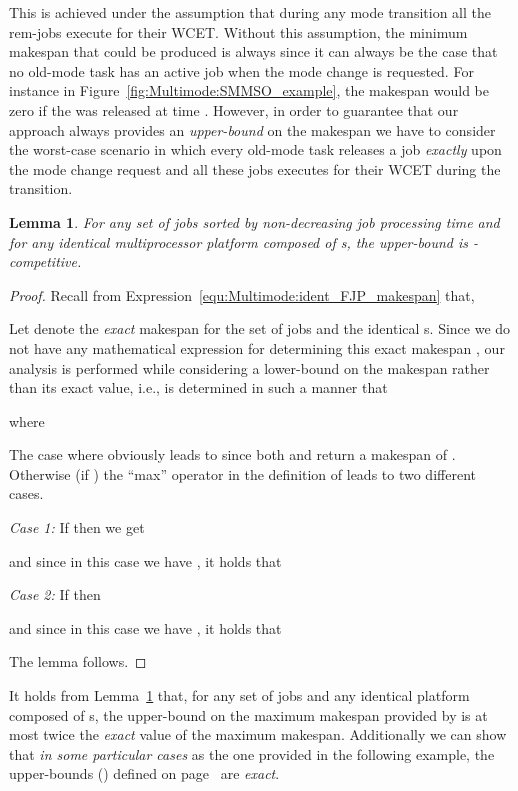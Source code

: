\documentclass{article}
\newtheorem{validity test}{Validity Test}
\newtheorem{Lemma}{Lemma}
\newtheorem{proof}{Proof}
\begin{document}
This is achieved under the assumption that during any mode transition all the rem-jobs execute for their WCET. Without this assumption, the minimum makespan that could be produced is always  since it can always be the case that no old-mode task has an active job when the mode change is requested. For instance in Figure~\ref{fig:Multimode:SMMSO_example}, the makespan would be zero if the  was released at time . However, in order to guarantee that our approach always provides an \emph{upper-bound} on the makespan we have to consider the worst-case scenario in which every old-mode task releases a job \emph{exactly} upon the mode change request and all these jobs executes for their WCET during the transition. 

\begin{Lemma}
\label{lem:Multimode:ident_accuracy_alpha}
For any set  of jobs sorted by non-decreasing job processing time and for any identical multiprocessor platform  composed of  s, the upper-bound  is -competitive.
\end{Lemma} 
\begin{proof}
Recall from Expression~\ref{equ:Multimode:ident_FJP_makespan} that, 

Let  denote the \emph{exact} makespan for the set  of jobs and the  identical s. Since we do not have any mathematical expression for determining this exact makespan , our analysis is performed while considering a lower-bound  on the makespan rather than its exact value, i.e.,  is determined in such a manner that 
 
where

The case where  obviously leads to  since both  and  return a makespan of . Otherwise (if ) the ``max'' operator in the definition of  leads to two different cases.

\noindent\emph{Case 1:} If  then we get

and since in this case we have , it holds that


\noindent\emph{Case 2:} If  then

and since in this case we have , it holds that

\noindent The lemma follows.
\end{proof}
     
It holds from Lemma~\ref{lem:Multimode:ident_accuracy_alpha} that, for any set  of jobs and any identical platform composed of  s, the upper-bound on the maximum makespan provided by  is at most twice the \emph{exact} value of the maximum makespan. Additionally we can show that \emph{in some particular cases} as the one provided in the following example, the upper-bounds  () defined on page~\pageref{lem:Multimode:ident_FJP_maxidle} are \emph{exact}. 
\end{document}

